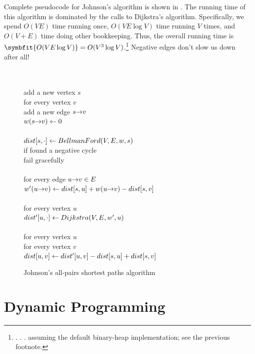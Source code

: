 Complete pseudocode for Johnson’s algorithm is shown in .
The running time of this algorithm is dominated by the calls to Dijkstra’s algorithm.
Specifically, we spend $O(VE)$ time running  once, $O(VE \log V)$ time running  $V$ times, and $O(V + E)$ time doing other bookkeeping.
Thus, the overall running time is $\symbfit{O(VE \log V)} = O(V^3 \log V)$.\footnote{. . . assuming the default binary-heap implementation; see the previous footnote.}
Negative edges don’t slow us down after all!
\begin{figure}[ht]
\centering
\begin{pseudocode}
\\
\\
add a new vertex $s$\\
for every vertex $v$\\
\Indent add a new edge $s\mathord{\rightarrow}v$\\
\Indent $w(s\mathord{\rightarrow}v) \gets 0$\\
\\
$dist[s, \cdot] \gets BellmanFord(V, E, w, s)$\\
if  found a negative cycle\\
\Indent fail gracefully\\
\\
for every edge $u\mathord{\rightarrow}v \in E$\\
\Indent $w'(u\mathord{\rightarrow}v) \gets dist[s, u] + w(u\mathord{\rightarrow}v) - dist[s, v]$\\
\\
for every vertex $u$\\
\Indent $dist'[u, \cdot] \gets Dijkstra(V, E, w', u)$\\
\\
for every vertex $u$\\
\Indent for every vertex $v$\\
\Indent\Indent $dist[u, v] \gets dist'[u, v] - dist[s, u] + dist[s, v]$
\end{pseudocode}
\caption{Johnson’s all-pairs shortest paths algorithm}
\label{fig:9.2}
\end{figure}

\section{Dynamic Programming}
\label{sec:9.5}

